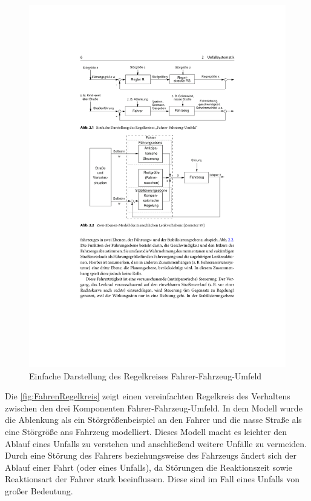\begin{figure}[htpb]
	\centering
	\includegraphics[width=\linewidth]{Bilder/Unfallforschung_1.pdf}
	\caption{Einfache Darstellung des Regelkreises 	\glq Fahrer-Fahrzeug-Umfeld\grq \citep{Appel2002}} 
	\label{fig:FahrenRegelkreis}
\end{figure}

Die \autoref{fig:FahrenRegelkreis} zeigt einen vereinfachten Regelkreis des Verhaltens zwischen den drei Komponenten \glqq Fahrer-Fahrzeug-Umfeld\grqq{}. In dem Modell wurde die Ablenkung als ein Störgrößenbeispiel an den Fahrer und die nasse Straße als eine Störgröße ans Fahrzeug modelliert. Dieses Modell macht es leichter den Ablauf eines Unfalls zu verstehen und anschließend weitere Unfälle zu vermeiden. Durch eine Störung des Fahrers beziehungsweise des Fahrzeugs ändert sich der Ablauf einer Fahrt (oder eines Unfalls), da Störungen die Reaktionszeit sowie Reaktionsart der Fahrer stark beeinflussen. Diese sind im Fall eines Unfalls von großer Bedeutung. \\


